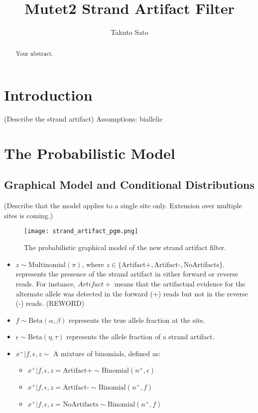 \documentclass[a4paper]{article}
\title{Mutet2 Strand Artifact Filter}
\author{Takuto Sato}
\begin{document}
\maketitle

\begin{abstract}
Your abstract.
\end{abstract}

\section{Introduction}

(Describe the strand artifact)
Assumptions: 
biallelic

\section{The Probabilistic Model}
\subsection{Graphical Model and Conditional Distributions}

(Describe that the model applies to a single site only. Extension over multiple sites is coming.)

\begin{figure}
\centering
\texttt{[image: strand\_artifact\_pgm.png]}
\caption{\label{fig:frog}The probabilistic graphical model of the new strand artifact filter.}
\end{figure}

\begin{itemize}
	\item $z \sim \text{Multinomial}(\pi)$, where $z  \in \{ \text{Artifact+}, \text{Artifact-}, \text{NoArtifacts} \}$, represents the presence of the strand artifact in either forward or reverse reads. For instance, $Artifact+$ means that the artifactual evidence for the alternate allele was detected in the forward (+) reads but not in the reverse (-) reads. (REWORD)
	\item $f \sim \text{Beta}(\alpha, \beta)$ represents the true allele fraction at the site.
	\item $\epsilon \sim \text{Beta}(\eta, \tau)$ represents the allele fraction of a strand artifact.
	\item $x^+ | f, \epsilon, z \sim$ A mixture of binomials, defined as:
		\begin{itemize}
			\item $x^+ | f, \epsilon, z = \text{Artifact+} \sim \text{Binomial} (n^+, \epsilon)$
			\item $x^+ | f, \epsilon, z = \text{Artifact-} \sim \text{Binomial} (n^+, f)$
			\item $x^+ | f, \epsilon, z = \text{NoArtifacts} \sim \text{Binomial} (n^+, f)$
		\end{itemize}			
\end{itemize}
\end{document}
